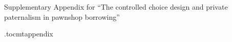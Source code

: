 
% 


%     


% 


\setcounter{table}{0}
\setcounter{figure}{0}
\setcounter{section}{0}



\begin{center}
	\LARGE Supplementary Appendix for ``The controlled choice design and private paternalism in pawnshop borrowing'' \\[0.5em]
	\large \author{Craig McIntosh \and Isaac Meza \and Joyce Sadka \and Enrique Seira \and Francis J.\ DiTraglia}
\end{center}


\appendix
{}
\renewcommand\thefigure{OA-\arabic{figure}}
\renewcommand\thetable{OA-\arabic{table}}
\renewcommand*{\thepage}{OA - \arabic{page}}
\renewcommand\thesection{Appendix \Alph{section}.}
\renewcommand\thesubsection{\Alph{section}.\arabic{subsection}}

\renewcommand\cftsecdotsep{\cftdotsep}
\renewcommand\cftsubsecdotsep{\cftnodots}
\renewcommand{\cftsecnumwidth}{6em}
 \renewcommand{\cftpnumalign}{r}


\renewcommand{\cftsecleader}{\cftdotfill{\cftsecdotsep}\hspace{1.8em}}

\etocdepthtag.toc{mtappendix}


